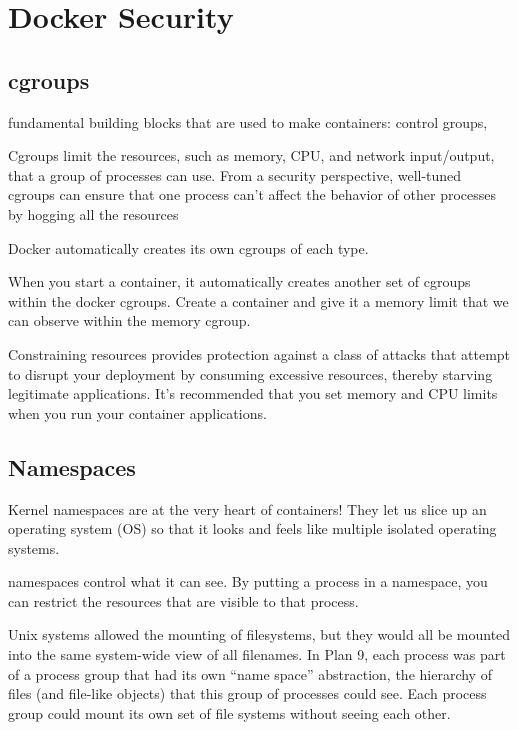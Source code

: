\section{Docker Security}
\label{sec::security}


\subsection{cgroups}
\label{ssec::security:cgroups}
fundamental building blocks that are used to make containers: control groups,

Cgroups limit the resources, such as memory, CPU, and network input/output, that a group of processes can use. From a security perspective, well-tuned cgroups can ensure that one process can't affect the behavior of other processes by hogging all the resources

Docker automatically creates its own cgroups of each type.

When you start a container, it automatically creates another set of cgroups within the docker cgroups. Create a container and give it a memory limit that we can observe within the memory cgroup.

Constraining resources provides protection against a class of attacks that attempt to disrupt your deployment by consuming excessive resources, thereby starving legitimate applications. It's recommended that you set memory and CPU limits when you run your container applications.

\subsection{Namespaces}
\label{ssec::security:namespaces}

Kernel namespaces are at the very heart of containers! They let us slice up an operating system (OS) so that it looks and feels like multiple isolated operating systems.

namespaces control what it can see. By putting a process in a namespace, you can restrict the resources that are visible to that process.

Unix systems allowed the mounting of filesystems, but they would all be mounted into the same system-wide view of all filenames. In Plan 9, each process was part of a process group that had its own “name space” abstraction, the hierarchy of files (and file-like objects) that this group of processes could see. Each process group could mount its own set of file systems without seeing each other.

